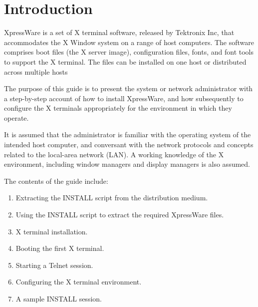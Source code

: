  \begin{latexonly}
    \setlength{\parskip}{0mm}
    \latexonlytoc
    \setlength{\parskip}{\medskipamount}
    \markright{\stardocname}
 \end{latexonly}


\clearpage

\section {Introduction}

XpressWare is a set of X terminal software, released by Tektronix Inc, that
accommodates the X Window system on a range of host computers. The software
comprises boot files (the X server image), configuration files, fonts, and
font tools to support the X terminal. The files can be installed on one host
or distributed across multiple hosts

The purpose of this guide is to present the system or network administrator
with a step-by-step account of how to install XpressWare, and how subsequently
to configure the X terminals appropriately for the environment in which they
operate.

It is assumed that the administrator is familiar with the operating system of
the intended host computer, and conversant with the network protocols and
concepts related to the local-area network (LAN). A working knowledge of the
X environment, including window managers and display managers is also assumed.

The contents of the guide include:

\begin {enumerate}

\item Extracting the INSTALL script from the distribution medium.

\item Using the INSTALL script to extract the required XpressWare files.

\item X terminal installation.

\item Booting the first X terminal.

\item Starting a Telnet session.

\item Configuring the X terminal environment.

\item A sample INSTALL session.

\end {enumerate}


